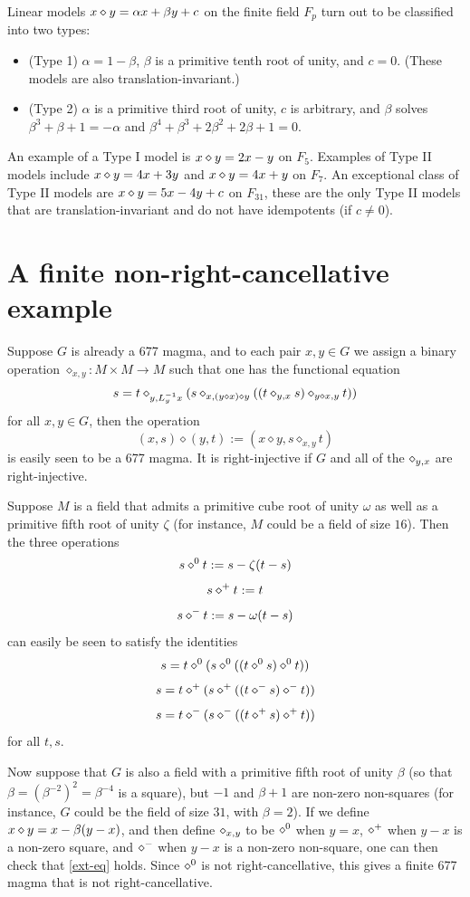 Linear models $x \diamond y = \alpha x + \beta y + c$ on the finite field $F_p$ turn out to be classified into two types:
\begin{itemize}
\item (Type 1) $\alpha=1-\beta$, $\beta$ is a primitive tenth root of unity, and $c=0$.  (These models are also translation-invariant.)
\item (Type 2) $\alpha$ is a primitive third root of unity, $c$ is arbitrary, and $\beta$ solves $\beta^3+\beta+1=-\alpha$ and $\beta^4+\beta^3+2\beta^2+2\beta+1=0$.
\end{itemize}
An example of a Type I model is $x \diamond y = 2x-y$ on $F_5$.  Examples of Type II models include $x \diamond y = 4x+3y$ and $x \diamond y = 4x+y$ on $F_7$.  An exceptional class of Type II models are $x \diamond y = 5x-4y+c$ on $F_{31}$, these are the only Type II models that are translation-invariant and do not have idempotents (if $c \neq 0$).

\section{A finite non-right-cancellative example}

Suppose $G$ is already a 677 magma, and to each pair $x,y \in G$ we assign a binary operation $\diamond_{x,y}: M \times M \to M$ such that one has the functional equation
\begin{equation}\label{ext-eq}
  s = t \diamond_{y,L_y^{-1} x} (s \diamond_{x, (y \diamond x) \diamond y} ((t \diamond_{y,x} s) \diamond_{y \diamond x, y} t))
\end{equation}
for all $x,y \in G$, then the operation
$$ (x,s) \diamond (y,t) := (x \diamond y, s \diamond_{x,y} t)$$
is easily seen to be a 677 magma.  It is right-injective if $G$ and all of the $\diamond_{y,x}$ are right-injective.

Suppose $M$ is a field that admits a primitive cube root of unity $\omega$ as well as a primitive fifth root of unity $\zeta$ (for instance, $M$ could be a field of size $16$).  Then the three operations
$$ s \diamond^0 t := s - \zeta(t-s)$$
$$ s \diamond^+ t := t$$
$$ s \diamond^- t := s - \omega(t-s)$$
can easily be seen to satisfy the identities
$$s = t \diamond^0 (s \diamond^0 ((t \diamond^0 s) \diamond^0 t))$$
$$s = t \diamond^+ (s \diamond^+ ((t \diamond^- s) \diamond^- t))$$
$$s = t \diamond^- (s \diamond^- ((t \diamond^+ s) \diamond^+ t))$$
for all $t,s$.

Now suppose that $G$ is also a field with a primitive fifth root of unity $\beta$ (so that $\beta = \left(\beta^{-2}\right)^2 = \beta^{-4}$ is a square), but $-1$ and $\beta+1$ are non-zero non-squares (for instance, $G$ could be the field of size $31$, with $\beta=2$).  If we define $x \diamond y = x - \beta(y-x)$, and then define $\diamond_{x,y}$ to be $\diamond^0$ when $y=x$, $\diamond^+$ when $y-x$ is a non-zero square, and $\diamond^-$ when $y-x$ is a non-zero non-square, one can then check that \eqref{ext-eq} holds. Since $\diamond^0$ is not right-cancellative, this gives a finite 677 magma that is not right-cancellative.


